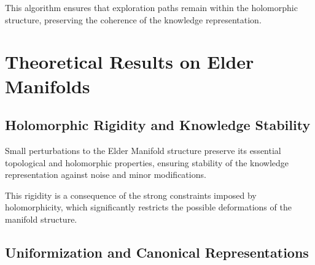 \noindent{}

This algorithm ensures that exploration paths remain within the holomorphic structure, preserving the coherence of the knowledge representation.

\section{Theoretical Results on Elder Manifolds}

\subsection{Holomorphic Rigidity and Knowledge Stability}

\begin{theorem}
Small perturbations to the Elder Manifold structure preserve its essential topological and holomorphic properties, ensuring stability of the knowledge representation against noise and minor modifications.
\end{theorem}

This rigidity is a consequence of the strong constraints imposed by holomorphicity, which significantly restricts the possible deformations of the manifold structure.

\subsection{Uniformization and Canonical Representations}

